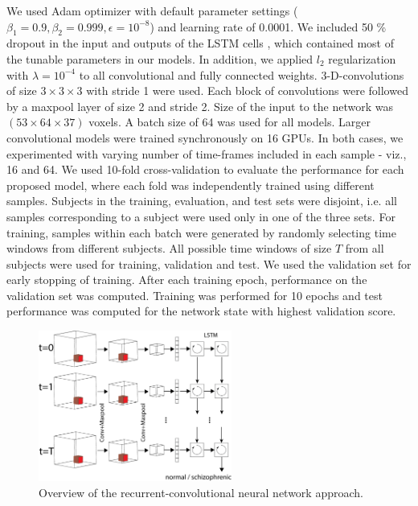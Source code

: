 \documentclass{article}
\begin{document}
We used Adam optimizer with default parameter settings ($\beta_1=0.9, \beta_2=0.999, \epsilon=10^{-8}$) \citep{Kingma2014} and learning rate of 0.0001. We included 50 \% dropout in the input and outputs of the LSTM cells \citep{Zaremba2014}, which contained most of the tunable parameters in our models. In addition, we applied $l_2$ regularization with $\lambda=10^{-4}$ to all convolutional and fully connected weights.
3-D-convolutions of size $3\times3\times3$ with stride 1 were used. Each block of convolutions were followed by a maxpool layer of size 2 and stride 2. Size of the input to the network was $(53\times64\times37)$ voxels. 
A batch size of 64 was used for all models. Larger convolutional models were trained synchronously on 16 GPUs. In both cases, we experimented with varying number of time-frames included in each sample - viz., 16 and 64.
We used 10-fold cross-validation to evaluate the performance for each proposed model, where each fold was independently trained using different samples. Subjects in the training, evaluation, and test sets were disjoint, i.e. all samples corresponding to a subject were used only in one of the three sets. For training, samples within each batch were generated by randomly selecting time windows from different subjects. All possible time windows of size $T$ from all subjects were used for training, validation and test. We used the validation set for early stopping of training. After each training epoch, performance on the validation set was computed. Training was performed for 10 epochs and test performance was computed for the network state with highest validation score.



\begin{figure}[t]
\begin{center}
\includegraphics[width=2.5in]{figures/overview.png}
\end{center}
\caption{Overview of the recurrent-convolutional neural network approach.}
\label{fig1}
\end{figure}
\end{document}
